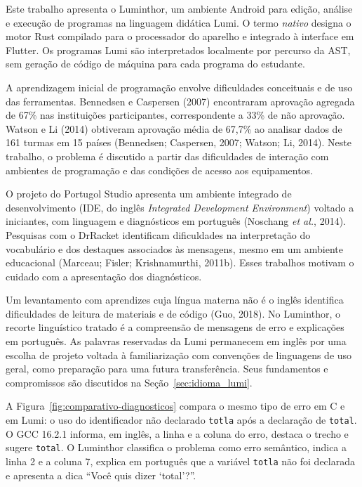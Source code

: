 \documentclass[
    12pt
    ,oneside
    ,a4paper
    ,chapter=TITLE
    ,section=TITLE
    ,sumario=abnt-6027-2012]{abntex2}
\newcommand{\citeMarceauOnward}{(Marceau; Fisler; Krishnamurthi, 2011b)}
\newcommand{\citeNoschang}{(Noschang \textit{et al.}, 2014)}
\newcommand{\citeTaxas}{(Bennedsen; Caspersen, 2007; Watson; Li, 2014)}
\newcommand{\citeGuo}{(Guo, 2018)}
\begin{document}
Este trabalho apresenta o Luminthor, um ambiente Android para edição, análise
e execução de programas na linguagem didática Lumi. O termo \textit{nativo}
designa o motor Rust compilado para o processador do aparelho e integrado à
interface em Flutter. Os programas Lumi são interpretados localmente por
percurso da AST, sem geração de código de máquina para cada programa do estudante.

A aprendizagem inicial de programação envolve dificuldades conceituais e de uso das
ferramentas. Bennedsen e Caspersen (2007) encontraram aprovação agregada de 67\%
nas instituições participantes, correspondente a 33\% de não aprovação. Watson e
Li (2014) obtiveram aprovação média de 67,7\% ao analisar dados de 161 turmas em
15 países \citeTaxas. Neste trabalho, o problema é discutido a partir das dificuldades de interação com
ambientes de programação e das condições de acesso aos equipamentos.

O projeto do Portugol Studio apresenta um ambiente integrado de desenvolvimento (IDE, do inglês \textit{Integrated Development Environment}) voltado a iniciantes, com linguagem
e diagnósticos em português \citeNoschang. Pesquisas com o DrRacket identificam
dificuldades na interpretação do vocabulário e dos destaques associados às mensagens,
mesmo em um ambiente educacional \citeMarceauOnward. Esses trabalhos motivam o cuidado com a apresentação dos diagnósticos.

Um levantamento com aprendizes cuja língua materna não é o inglês identifica
dificuldades de leitura de materiais e de código \citeGuo. No Luminthor, o recorte
linguístico tratado é a compreensão de mensagens de erro e explicações em português.
As palavras reservadas da Lumi permanecem em inglês por uma escolha de projeto
voltada à familiarização com convenções de linguagens de uso geral, como preparação
para uma futura transferência. Seus fundamentos e compromissos são discutidos na
Seção~\ref{sec:idioma_lumi}.

A Figura~\ref{fig:comparativo-diagnosticos} compara o mesmo tipo de erro em C e em
Lumi: o uso do identificador não declarado \texttt{totla} após a declaração de
\texttt{total}. O GCC 16.2.1 informa, em inglês, a linha e a coluna do erro, destaca
o trecho e sugere \texttt{total}. O Luminthor classifica o problema como erro
semântico, indica a linha 2 e a coluna 7, explica em português que a variável
\texttt{totla} não foi declarada e apresenta a dica ``Você quis dizer `total'?''.
\end{document}
